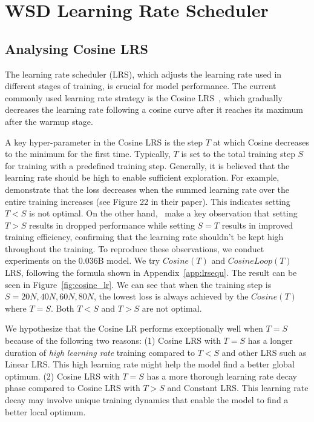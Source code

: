 
\section{WSD Learning Rate Scheduler}
\label{sec:wsdlrs}
\subsection{Analysing Cosine LRS}
The learning rate scheduler (LRS), which adjusts the learning rate used in different stages of training, is crucial for model performance. The current commonly used learning rate strategy is the Cosine LRS~\citep{kaplan2020scaling, hoffmann2022training, rae2021scaling, touvron2023llama, bai2023qwen, almazrouei2023falcon}, which gradually decreases the learning rate following a cosine curve after it reaches its maximum after the warmup stage. 

A key hyper-parameter in the Cosine LRS is the step $T$ at which Cosine decreases to the minimum for the first time. Typically, $T$ is set to the total training step $S$ for training with a predefined training step. Generally, it is believed that the learning rate should be high to enable sufficient exploration. For example, ~\cite{kaplan2020scaling} demonstrate that the loss decreases  when the summed learning rate over the entire training increases (see Figure 22 in their paper). This indicates setting $T < S$ is not optimal. On the other hand,~\cite{hoffmann2022training} make a key observation that setting $T > S$ results in dropped performance while setting $S = T$ results in improved training efficiency, confirming that the learning rate shouldn't be kept high throughout the training. To reproduce these observations, we conduct experiments on the 0.036B model. We try $Cosine(T)$ and $CosineLoop(T)$ LRS, following the formula shown in Appendix~\ref{app:lrsequ}. The result can be seen in Figure~\ref{fig:cosine_lr}. We can see that when the training step is $S=20N, 40N, 60N, 80N$, the lowest loss is always achieved by the $Cosine(T)$ where $T = S$. Both $T<S$ and $T>S$ are not optimal. 

We hypothesize that the Cosine LR performs exceptionally well when $T = S$ because of the following two reasons: (1) Cosine LRS with $T = S$ has a longer duration of \textit{high learning rate} training compared to $T < S$ and other LRS such as Linear LRS. This high learning rate might help the model find a better global optimum.
(2) Cosine LRS with $T = S$ has a more thorough learning rate decay phase compared to Cosine LRS with $T > S$ and Constant LRS. This learning rate decay may involve unique training dynamics that enable the model to find a better local optimum.


